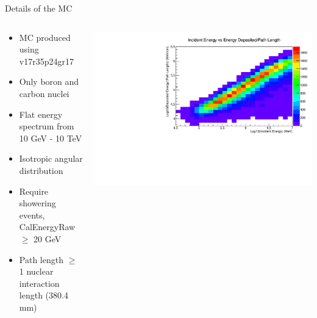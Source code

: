 \documentclass[10pt, table]{beamer}
\begin{document}
\begin{frame}{Details of the MC}

     \begin{columns}[t] %
     \begin{column}[T]{0.35 \textwidth} %
      \begin{itemize}
	\item MC produced using v17r35p24gr17
	\item Only boron and carbon nuclei 
	\item Flat energy spectrum from 10 GeV - 10 TeV
	\item Isotropic angular distribution
	\item Require showering events, CalEnergyRaw $\geq$ 20 GeV
	\item Path length $\geq$ 1 nuclear interaction length (380.4 mm)
       \end{itemize}
     \end{column}
     \begin{column}[T]{0.75 \textwidth} %
          \includegraphics[width = \columnwidth]{CalEnergyRaw-CalFullLen_mom12}
     \end{column}
     \end{columns}

\end{frame}

\end{document}

